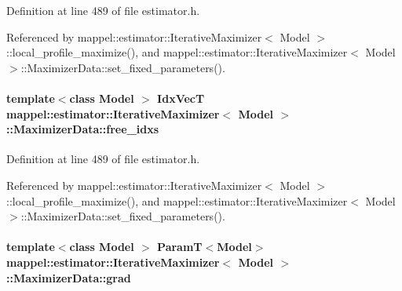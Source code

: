 Definition at line 489 of file estimator.\+h.



Referenced by mappel\+::estimator\+::\+Iterative\+Maximizer$<$ Model $>$\+::local\+\_\+profile\+\_\+maximize(), and mappel\+::estimator\+::\+Iterative\+Maximizer$<$ Model $>$\+::\+Maximizer\+Data\+::set\+\_\+fixed\+\_\+parameters().

\paragraph[{\texorpdfstring{free\+\_\+idxs}{free_idxs}}]{\setlength{\rightskip}{0pt plus 5cm}template$<$class Model $>$ {\bf Idx\+VecT} {\bf mappel\+::estimator\+::\+Iterative\+Maximizer}$<$ Model $>$\+::Maximizer\+Data\+::free\+\_\+idxs}\hypertarget{classmappel_1_1estimator_1_1IterativeMaximizer_1_1MaximizerData_a96fb9ed6b5c603ab2380b9dd24723bca}{}\label{classmappel_1_1estimator_1_1IterativeMaximizer_1_1MaximizerData_a96fb9ed6b5c603ab2380b9dd24723bca}


Definition at line 489 of file estimator.\+h.



Referenced by mappel\+::estimator\+::\+Iterative\+Maximizer$<$ Model $>$\+::local\+\_\+profile\+\_\+maximize(), and mappel\+::estimator\+::\+Iterative\+Maximizer$<$ Model $>$\+::\+Maximizer\+Data\+::set\+\_\+fixed\+\_\+parameters().

\paragraph[{\texorpdfstring{grad}{grad}}]{\setlength{\rightskip}{0pt plus 5cm}template$<$class Model $>$ {\bf ParamT}$<$Model$>$ {\bf mappel\+::estimator\+::\+Iterative\+Maximizer}$<$ Model $>$\+::Maximizer\+Data\+::grad}\hypertarget{classmappel_1_1estimator_1_1IterativeMaximizer_1_1MaximizerData_a7a71e71e379159ee30914e0539196c71}{}\label{classmappel_1_1estimator_1_1IterativeMaximizer_1_1MaximizerData_a7a71e71e379159ee30914e0539196c71}


